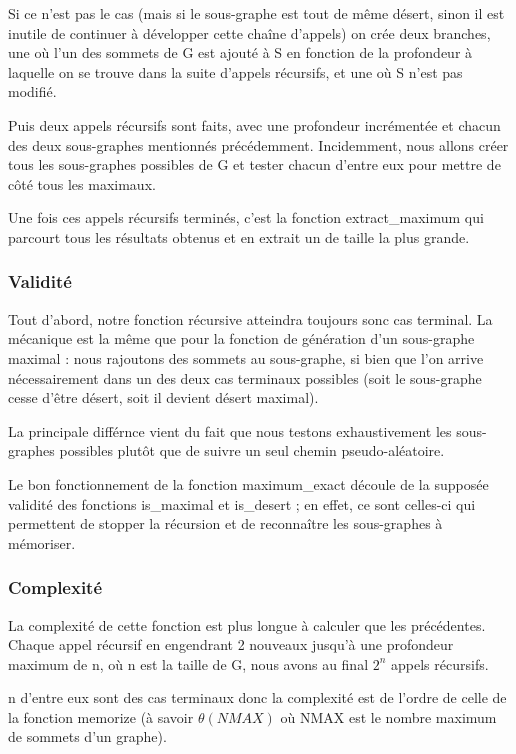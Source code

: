 Si ce n'est pas le cas (mais si le sous-graphe est tout de même désert, sinon il est inutile de continuer à développer cette chaîne d'appels) on crée deux branches, une où l'un des sommets de G est ajouté à S en fonction de la profondeur à laquelle on se trouve dans la suite d'appels récursifs, et une où S n'est pas modifié. 

Puis deux appels récursifs sont faits, avec une profondeur incrémentée et chacun des deux sous-graphes mentionnés précédemment. Incidemment, nous allons créer tous les sous-graphes possibles de G et tester chacun d'entre eux pour mettre de côté tous les maximaux.

Une fois ces appels récursifs terminés, c'est la fonction extract\_maximum qui parcourt tous les résultats obtenus et en extrait un de taille la plus grande. 

\subsubsection{Validité}

Tout d'abord, notre fonction récursive atteindra toujours sonc cas terminal. La mécanique est la même que pour la fonction de génération d'un sous-graphe maximal : nous rajoutons des sommets au sous-graphe, si bien que l'on arrive nécessairement dans un des deux cas terminaux  possibles (soit le sous-graphe cesse d'être désert, soit il devient désert maximal). 

La principale différnce vient du fait que nous testons exhaustivement les sous-graphes possibles plutôt que de suivre un seul chemin  pseudo-aléatoire. 

Le bon fonctionnement de la fonction maximum\_exact découle de la supposée validité des fonctions is\_maximal et is\_desert ; en effet, ce sont celles-ci qui permettent de stopper la récursion et de reconnaître les sous-graphes à mémoriser. 

\subsubsection{Complexité}

La complexité de cette fonction est plus longue à calculer que les précédentes. Chaque appel récursif en engendrant 2 nouveaux jusqu'à une profondeur maximum de n, où n est la taille de G, nous avons au final $2^n$ appels récursifs. 

n d'entre eux sont des cas terminaux donc la complexité est de l'ordre de celle de la fonction memorize (à savoir $\theta(NMAX)$ où NMAX est le nombre maximum de sommets d'un graphe).

